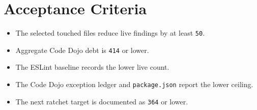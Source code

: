 \section{Acceptance Criteria}\label{record-241-acceptance-criteria}

\begin{itemize}
\tightlist
\item
  The selected touched files reduce live findings by at least \texttt{5\allowbreak{}0}.
\item
  Aggregate Code Dojo debt is \texttt{4\allowbreak{}1\allowbreak{}4} or lower.
\item
  The ESLint baseline records the lower live count.
\item
  The Code Dojo exception ledger and \texttt{p\allowbreak{}a\allowbreak{}c\allowbreak{}k\allowbreak{}a\allowbreak{}g\allowbreak{}e\allowbreak{}.\allowbreak{}j\allowbreak{}s\allowbreak{}o\allowbreak{}n} report the lower ceiling.
\item
  The next ratchet target is documented as \texttt{3\allowbreak{}6\allowbreak{}4} or lower.
\end{itemize}

